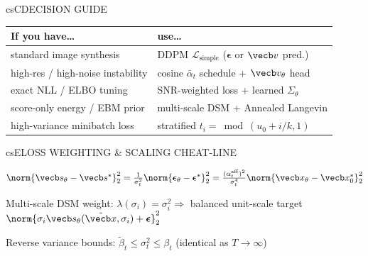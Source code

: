 \documentclass[../../../../master.tex]{subfiles}
\begin{document}
\begin{cscolumns}
\begin{cscard}{csC}{DECISION GUIDE}
  \renewcommand{\arraystretch}{1.22}\small
  \begin{tabular}{@{}>{\raggedright\arraybackslash}p{3.1cm}>{\raggedright\arraybackslash}p{4.6cm}@{}}
    \textbf{If you have\ldots} & \textbf{use\ldots}\\ \hline
    standard image synthesis & DDPM $\mathcal L_{\mathrm{simple}}$ ($\boldsymbol\epsilon$ or $\vecb v$ pred.)\\
    high-res / high-noise instability & cosine $\bar\alpha_t$ schedule + $\vecb v_\theta$ head\\
    exact NLL / ELBO tuning & SNR-weighted loss + learned $\Sigma_\theta$\\
    score-only energy / EBM prior & multi-scale DSM + Annealed Langevin\\
    high-variance minibatch loss & stratified $t_i=\bmod(u_0+i/k,1)$\\
  \end{tabular}
\end{cscard}

\begin{cscard}{csE}{LOSS WEIGHTING \& SCALING CHEAT-LINE}
  \begin{csbul}
    \item $\norm{\vecb s_\theta-\vecb s^*}_2^2 = \frac{1}{\sigma_t^2}\norm{\boldsymbol\epsilon_\theta-\boldsymbol\epsilon^*}_2^2 = \frac{(\alpha_t^{\mathrm{aff}})^2}{\sigma_t^4}\norm{\vecb x_\theta-\vecb x_0^*}_2^2$
    \item Multi-scale DSM weight: $\lambda(\sigma_i)=\sigma_i^2 \Rightarrow$ balanced unit-scale target $\norm{\sigma_i\vecb s_\theta(\tilde{\vecb x},\sigma_i)+\boldsymbol\epsilon}_2^2$
    \item Reverse variance bounds: $\tilde\beta_t \le \sigma_t^2 \le \beta_t$ (identical as $T\to\infty$)
  \end{csbul}
\end{cscard}


\end{cscolumns}
\end{document}
